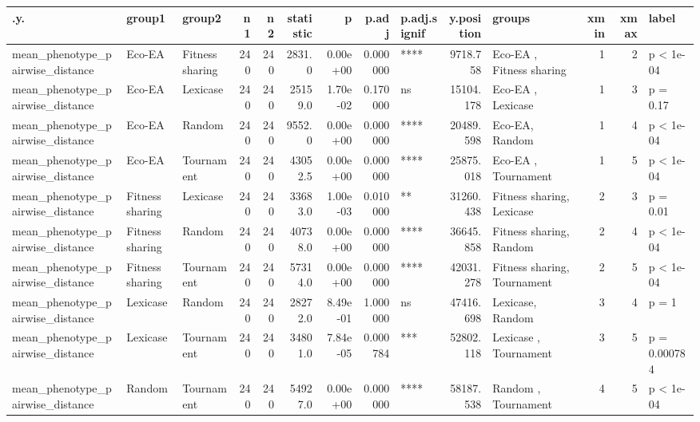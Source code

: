 \documentclass[]{book}
\begin{document}
\begin{table}
\centering
\begin{tabular}[t]{l|l|l|r|r|r|r|r|l|r|l|r|r|l}
\hline
.y. & group1 & group2 & n1 & n2 & statistic & p & p.adj & p.adj.signif & y.position & groups & xmin & xmax & label\\
\hline
mean\_phenotype\_pairwise\_distance & Eco-EA & Fitness sharing & 240 & 240 & 2831.0 & 0.00e+00 & 0.000000 & **** & 9718.758 & Eco-EA         , Fitness sharing & 1 & 2 & p < 1e-04\\
\hline
mean\_phenotype\_pairwise\_distance & Eco-EA & Lexicase & 240 & 240 & 25159.0 & 1.70e-02 & 0.170000 & ns & 15104.178 & Eco-EA  , Lexicase & 1 & 3 & p = 0.17\\
\hline
mean\_phenotype\_pairwise\_distance & Eco-EA & Random & 240 & 240 & 9552.0 & 0.00e+00 & 0.000000 & **** & 20489.598 & Eco-EA, Random & 1 & 4 & p < 1e-04\\
\hline
mean\_phenotype\_pairwise\_distance & Eco-EA & Tournament & 240 & 240 & 43052.5 & 0.00e+00 & 0.000000 & **** & 25875.018 & Eco-EA    , Tournament & 1 & 5 & p < 1e-04\\
\hline
mean\_phenotype\_pairwise\_distance & Fitness sharing & Lexicase & 240 & 240 & 33683.0 & 1.00e-03 & 0.010000 & ** & 31260.438 & Fitness sharing, Lexicase & 2 & 3 & p = 0.01\\
\hline
mean\_phenotype\_pairwise\_distance & Fitness sharing & Random & 240 & 240 & 40738.0 & 0.00e+00 & 0.000000 & **** & 36645.858 & Fitness sharing, Random & 2 & 4 & p < 1e-04\\
\hline
mean\_phenotype\_pairwise\_distance & Fitness sharing & Tournament & 240 & 240 & 57314.0 & 0.00e+00 & 0.000000 & **** & 42031.278 & Fitness sharing, Tournament & 2 & 5 & p < 1e-04\\
\hline
mean\_phenotype\_pairwise\_distance & Lexicase & Random & 240 & 240 & 28272.0 & 8.49e-01 & 1.000000 & ns & 47416.698 & Lexicase, Random & 3 & 4 & p = 1\\
\hline
mean\_phenotype\_pairwise\_distance & Lexicase & Tournament & 240 & 240 & 34801.0 & 7.84e-05 & 0.000784 & *** & 52802.118 & Lexicase  , Tournament & 3 & 5 & p = 0.000784\\
\hline
mean\_phenotype\_pairwise\_distance & Random & Tournament & 240 & 240 & 54927.0 & 0.00e+00 & 0.000000 & **** & 58187.538 & Random    , Tournament & 4 & 5 & p < 1e-04\\
\hline
\end{tabular}
\end{table}
\end{document}
